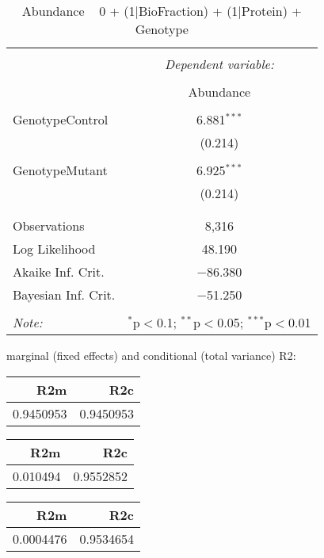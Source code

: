 \documentclass[11pt]{report}
\begin{document}
\begin{table}[!htbp] \centering 
  \caption{Abundance ~ 0 + (1|BioFraction) + (1|Protein) + Genotype} 
  \label{} 
\begin{tabular}{@{\extracolsep{5pt}}lc} 
\\[-1.8ex]\hline 
\hline \\[-1.8ex] 
 & \multicolumn{1}{c}{\textit{Dependent variable:}} \\ 
\cline{2-2} 
\\[-1.8ex] & Abundance \\ 
\hline \\[-1.8ex] 
 GenotypeControl & 6.881$^{***}$ \\ 
  & (0.214) \\ 
  & \\ 
 GenotypeMutant & 6.925$^{***}$ \\ 
  & (0.214) \\ 
  & \\ 
\hline \\[-1.8ex] 
Observations & 8,316 \\ 
Log Likelihood & 48.190 \\ 
Akaike Inf. Crit. & $-$86.380 \\ 
Bayesian Inf. Crit. & $-$51.250 \\ 
\hline 
\hline \\[-1.8ex] 
\textit{Note:}  & \multicolumn{1}{r}{$^{*}$p$<$0.1; $^{**}$p$<$0.05; $^{***}$p$<$0.01} \\ 
\end{tabular} 
\end{table} 
marginal (fixed effects) and conditional (total variance) R2:

\begin{tabular}{r|r}
\hline
R2m & R2c\\
\hline
0.9450953 & 0.9450953\\
\hline
\end{tabular}

\begin{tabular}{r|r}
\hline
R2m & R2c\\
\hline
0.010494 & 0.9552852\\
\hline
\end{tabular}

\begin{tabular}{r|r}
\hline
R2m & R2c\\
\hline
0.0004476 & 0.9534654\\
\hline
\end{tabular}
\end{document}
